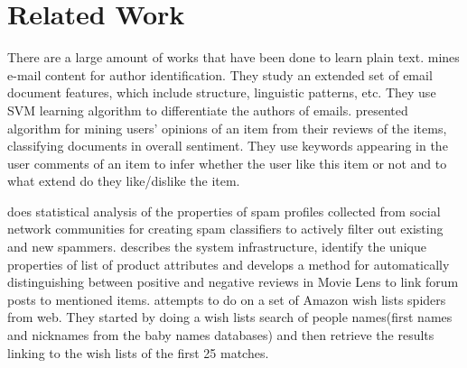 \section{Related Work}

There are a large amount of works that have been done to learn plain text. \cite{de2001mining} mines e-mail content for author identification. They study an extended set of email document features, which include structure, linguistic patterns, etc. They use SVM learning algorithm to differentiate the authors of emails. \cite{pang2002thumbs}presented algorithm for mining users' opinions of an item from their reviews of the items, classifying documents in overall sentiment. They use keywords appearing in the user comments of an item to infer whether the user like this item or not and to what extend do they like/dislike the item.

\cite{Lee:2010:USS:1835449.1835522} does statistical analysis of the properties of spam profiles collected from social network communities for creating spam classifiers to actively filter out existing and new spammers. \cite{dave2003mining} describes the system infrastructure, identify the unique properties of list of product attributes and develops a method for automatically distinguishing between positive and negative reviews in Movie Lens to link forum posts to mentioned items. \cite{kraft2007mashing}attempts to do on a set of Amazon wish lists spiders from web. They started by doing a wish lists search of people names(first names and nicknames from the baby names databases) and then retrieve the results linking to the wish lists of the first 25 matches. 
